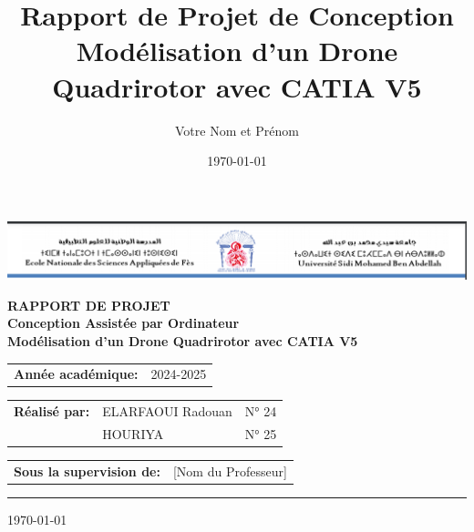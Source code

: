 \documentclass[a4paper,12pt]{report}
\title{\Huge{\textbf{\color{bleuPrimaire}Rapport de Projet de Conception}}\\\Large{\color{bleuSecondaire}Modélisation d'un Drone Quadrirotor avec CATIA V5}}
\author{Votre Nom et Prénom}
\date{\today}
\begin{document}
\begin{titlepage}
    \begin{center}
        \includegraphics[width=\textwidth]{images/ensa_header.png}
        
        \vspace{2cm}
        
        {\color{bleuPrimaire}\textbf{\Huge{RAPPORT DE PROJET}}}\\
        \vspace{0.5cm}
        {\color{bleuSecondaire}\textbf{\LARGE{Conception Assistée par Ordinateur}}}\\
        \vspace{1cm}
        {\color{bleuPrimaire}\textbf{\huge{Modélisation d'un Drone Quadrirotor avec CATIA V5}}}
        
        \vspace{2cm}
        
        \begin{tabular}{l l}
            \textbf{Année académique:} & 2024-2025 \\
        \end{tabular}
        
        \vfill
        
        \begin{tabular}{l l l}
            \textbf{Réalisé par:} & ELARFAOUI Radouan & N° 24 \\
            & HOURIYA & N° 25 \\
        \end{tabular}
        
        \vspace{0.8cm}
        
        \begin{tabular}{l l}
            \textbf{Sous la supervision de:} & [Nom du Professeur] \\
        \end{tabular}
        
        \vspace{1.5cm}
        
        \begin{center}
            \textcolor{bleuPrimaire}{\rule{0.7\textwidth}{1pt}}
        \end{center}
        
        \vspace{0.5cm}
        
        {\Large{\textcolor{gris}{\today}}}
        
    \end{center}
\end{titlepage}
\end{document}
